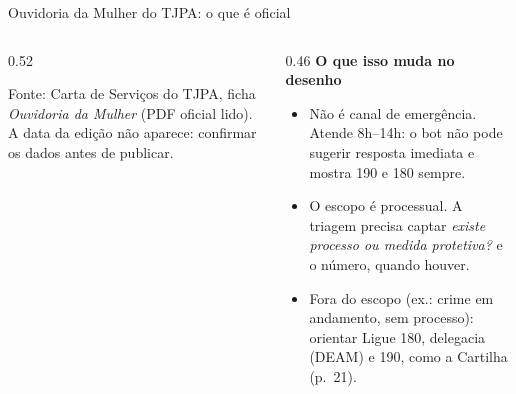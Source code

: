 \documentclass[aspectratio=169,10pt]{beamer}
\newcommand{\fonte}[1]{\par\vskip3pt{\tiny\textcolor{cinza}{Fonte: #1}}}
\begin{document}
\begin{frame}{Ouvidoria da Mulher do TJPA: o que é oficial}
\begin{columns}[T]
\begin{column}{0.52\textwidth}
\fonte{Carta de Serviços do TJPA, ficha \emph{Ouvidoria da Mulher} (PDF oficial lido). A data da edição não aparece: confirmar os dados antes de publicar.}
\end{column}
\begin{column}{0.46\textwidth}
\textbf{O que isso muda no desenho}
\begin{itemize}\setlength\itemsep{4pt}\small
  \item \alert{Não é canal de emergência.} Atende 8h--14h: o bot não pode sugerir resposta imediata e mostra 190 e 180 sempre.
  \item \alert{O escopo é processual.} A triagem precisa captar \emph{existe processo ou medida protetiva?} e o número, quando houver.
  \item \alert{Fora do escopo} (ex.: crime em andamento, sem processo): orientar Ligue 180, delegacia (DEAM) e 190, como a Cartilha (p.~21).
\end{itemize}
\end{column}
\end{columns}
\end{frame}
\end{document}
